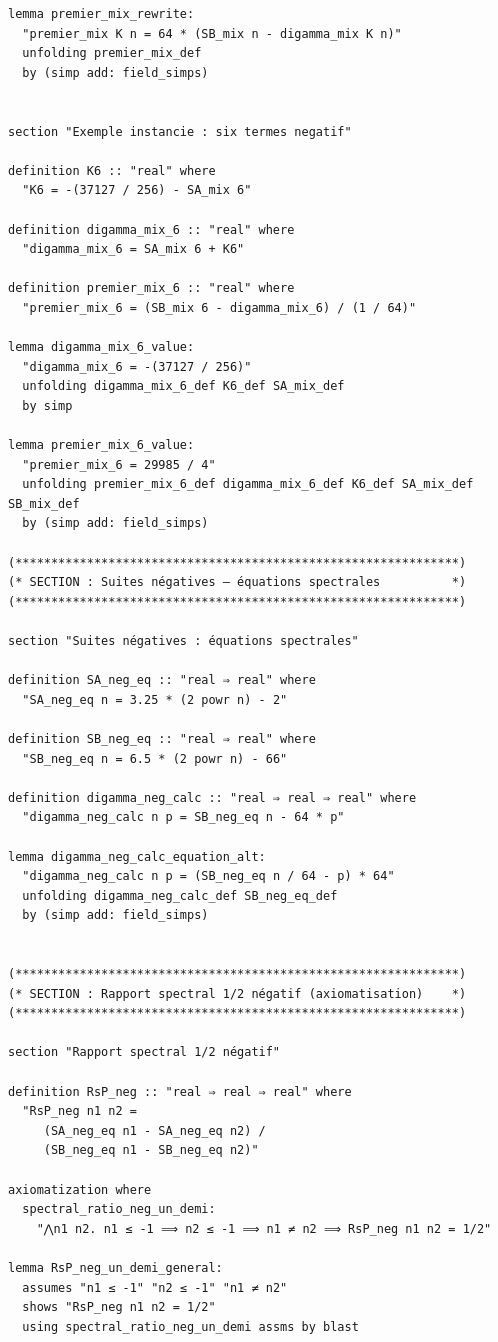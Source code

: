 \documentclass[a4paper,11pt]{article}
\begin{document}
\begin{holcode}[title={\textcolor{white}{File: methode\_spectral.thy -- Part 1/4}}]
\begin{lstlisting}
lemma premier_mix_rewrite:
  "premier_mix K n = 64 * (SB_mix n - digamma_mix K n)"
  unfolding premier_mix_def
  by (simp add: field_simps)


section "Exemple instancie : six termes negatif"

definition K6 :: "real" where
  "K6 = -(37127 / 256) - SA_mix 6"

definition digamma_mix_6 :: "real" where
  "digamma_mix_6 = SA_mix 6 + K6"

definition premier_mix_6 :: "real" where
  "premier_mix_6 = (SB_mix 6 - digamma_mix_6) / (1 / 64)"

lemma digamma_mix_6_value:
  "digamma_mix_6 = -(37127 / 256)"
  unfolding digamma_mix_6_def K6_def SA_mix_def
  by simp

lemma premier_mix_6_value:
  "premier_mix_6 = 29985 / 4"
  unfolding premier_mix_6_def digamma_mix_6_def K6_def SA_mix_def SB_mix_def
  by (simp add: field_simps)

(**************************************************************)
(* SECTION : Suites négatives – équations spectrales          *)
(**************************************************************)

section "Suites négatives : équations spectrales"

definition SA_neg_eq :: "real ⇒ real" where
  "SA_neg_eq n = 3.25 * (2 powr n) - 2"

definition SB_neg_eq :: "real ⇒ real" where
  "SB_neg_eq n = 6.5 * (2 powr n) - 66"

definition digamma_neg_calc :: "real ⇒ real ⇒ real" where
  "digamma_neg_calc n p = SB_neg_eq n - 64 * p"

lemma digamma_neg_calc_equation_alt:
  "digamma_neg_calc n p = (SB_neg_eq n / 64 - p) * 64"
  unfolding digamma_neg_calc_def SB_neg_eq_def
  by (simp add: field_simps)


(**************************************************************)
(* SECTION : Rapport spectral 1/2 négatif (axiomatisation)    *)
(**************************************************************)

section "Rapport spectral 1/2 négatif"

definition RsP_neg :: "real ⇒ real ⇒ real" where
  "RsP_neg n1 n2 =
     (SA_neg_eq n1 - SA_neg_eq n2) /
     (SB_neg_eq n1 - SB_neg_eq n2)"

axiomatization where
  spectral_ratio_neg_un_demi:
    "⋀n1 n2. n1 ≤ -1 ⟹ n2 ≤ -1 ⟹ n1 ≠ n2 ⟹ RsP_neg n1 n2 = 1/2"

lemma RsP_neg_un_demi_general:
  assumes "n1 ≤ -1" "n2 ≤ -1" "n1 ≠ n2"
  shows "RsP_neg n1 n2 = 1/2"
  using spectral_ratio_neg_un_demi assms by blast



\end{lstlisting}
\end{holcode}
\end{document}

